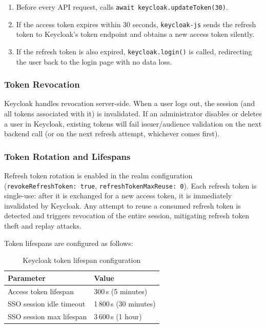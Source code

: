 \documentclass[12pt,a4paper]{report}
\begin{document}
\begin{enumerate}
  \item Before every API request,  calls
        \texttt{await keycloak.\allowbreak{}updateToken(30)}.
  \item If the access token expires within 30 seconds, \texttt{keycloak-js} sends the refresh
        token to Keycloak's token endpoint and obtains a new access token silently.
  \item If the refresh token is also expired, \texttt{keycloak.login()} is called, redirecting
        the user back to the login page with no data loss.
\end{enumerate}

\subsubsection{Token Revocation}

Keycloak handles revocation server-side. When a user logs out, the session (and all tokens
associated with it) is invalidated. If an administrator disables or deletes a user in
Keycloak, existing tokens will fail issuer/audience validation on the next backend call
(or on the next refresh attempt, whichever comes first).

\subsubsection{Token Rotation and Lifespans}

Refresh token rotation is enabled in the realm configuration
(\texttt{revokeRefreshToken: true}, \texttt{refreshTokenMaxReuse: 0}). Each refresh token
is single-use: after it is exchanged for a new access token, it is immediately invalidated
by Keycloak. Any attempt to reuse a consumed refresh token is detected and triggers
revocation of the entire session, mitigating refresh token theft and replay attacks.

Token lifespans are configured as follows:

\begin{table}[H]
\centering
\caption{Keycloak token lifespan configuration}
\begin{tabular}{ll}
\toprule
\textbf{Parameter} & \textbf{Value} \\
\midrule
Access token lifespan       & 300\,s (5 minutes) \\
SSO session idle timeout    & 1\,800\,s (30 minutes) \\
SSO session max lifespan    & 3\,600\,s (1 hour) \\
\bottomrule
\end{tabular}
\end{table}
\end{document}
